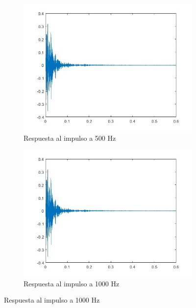 \begin{figure}[!htb]
    \centering
    \begin{subfigure}{0.3\textwidth}
        \centering
        \includegraphics[width=\linewidth]{imagenes/RIR_500Hz_RIR_Measurement.jpg}
        \caption{\footnotesize Respuesta al impulso a 500 Hz}
        \label{fig:sub1}
    \end{subfigure}
    \hfill
    \begin{subfigure}{0.3\textwidth}
        \centering
        \includegraphics[width=\linewidth]{imagenes/RIR_1000Hz_RIR_Measurement.jpg}
        \caption{\footnotesize Respuesta al impulso a 1000 Hz}
        \label{fig:sub2}
    \end{subfigure}

\end{figure}
